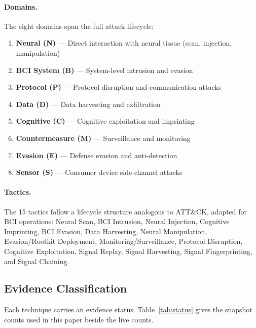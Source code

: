\paragraph{Domains.}
The eight domains span the full attack lifecycle:

\begin{enumerate}
  \item \textbf{Neural (N)} --- Direct interaction with neural tissue
        (scan, injection, manipulation)
  \item \textbf{BCI System (B)} --- System-level intrusion and evasion
  \item \textbf{Protocol (P)} --- Protocol disruption and communication attacks
  \item \textbf{Data (D)} --- Data harvesting and exfiltration
  \item \textbf{Cognitive (C)} --- Cognitive exploitation and imprinting
  \item \textbf{Countermeasure (M)} --- Surveillance and monitoring
  \item \textbf{Evasion (E)} --- Defense evasion and anti-detection
  \item \textbf{Sensor (S)} --- Consumer device side-channel attacks
\end{enumerate}

\paragraph{Tactics.}
The 15 tactics follow a lifecycle structure analogous to ATT\&CK, adapted for BCI operations:
Neural Scan, BCI Intrusion, Neural Injection, Cognitive Imprinting, BCI Evasion,
Data Harvesting, Neural Manipulation, Evasion/Rootkit Deployment, Monitoring/Surveillance,
Protocol Disruption, Cognitive Exploitation, Signal Replay, Signal Harvesting,
Signal Fingerprinting, and Signal Chaining.

\subsection{Evidence Classification}

Each technique carries an evidence status. Table~\ref{tab:status} gives the snapshot
counts used in this paper beside the live counts.

